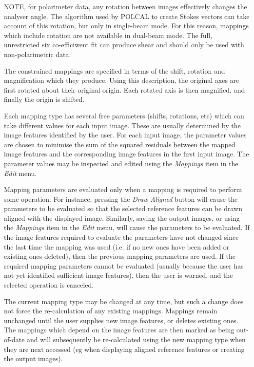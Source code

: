 \documentclass[11pt]{article}
\newcommand{\htmlref}[2]{#1}
\newcommand{\xref}[3]{#1}
\begin{document}
NOTE, for polarimeter data, any rotation between images
effectively changes the analyser angle. The algorithm used by
\xref{POLCAL}{sun223}{POLCAL} to create Stokes vectors can take account
of this rotation, but only in single-beam mode. For this reason, mappings
which include rotation are not available in dual-beam mode. The full,
unrestricted six co-efficiwent fit can produce shear and should only
be used with non-polarimetric data.

The constrained mappings are specified in terms of the shift, rotation and
magnification which they produce. Using this description, the original
axes are first rotated about their original origin. Each rotated axis is
then magnified, and finally the origin is shifted.

Each mapping type has several free parameters (shifts, rotations, etc)
which can take different values for each input image. These are usually
determined by the image features identified by the user. For each input
image, the parameter values are chosen to minimise the sum of the squared
residuals between the mapped image features and the corresponding image
features in the first input image. The parameter values may be inspected
and edited using the \htmlref{\emph{Mappings}}{POLKA_EDIT_MAPPINGS} item
in the \htmlref{\emph{Edit}}{POLKA_EDIT_MENU} menu.

Mapping parameters are evaluated only when a mapping is required to
perform some operation. For instance, pressing the \htmlref{\emph{Draw
Aligned}}{POLKA_DRAW_ALIGNED} button will cause the parameters to be
evaluated so that the selected reference features can be drawn
aligned with the displayed image. Similarly, \htmlref{saving}{POLKA_SAVE}
the output images, or using the \htmlref{\emph{Mappings}}{POLKA_EDIT_MAPPINGS}
item in the \htmlref{\emph{Edit}}{POLKA_EDIT_MENU} menu, will cause the
parameters to be evaluated. If the image features required to evaluate
the parameters have not changed since the last time the mapping was used
(i.e. if no new ones have been added or existing ones deleted), then the
previous mapping parameters are used. If the required mapping parameters
cannot be evaluated (usually because the user has not yet identified
sufficient image features), then the user is warned, and the selected
operation is canceled.

The current mapping type may be changed at any time, but such a change
does not force the re-calculation of any existing mappings. Mappings
remain unchanged until the user supplies new image features, or deletes
existing ones. The mappings which depend on the image features are then
marked as being out-of-date and will subsequently be re-calculated using
the new mapping type when they are next accessed (eg when displaying
aligned reference features or creating the output images).
\end{document}
